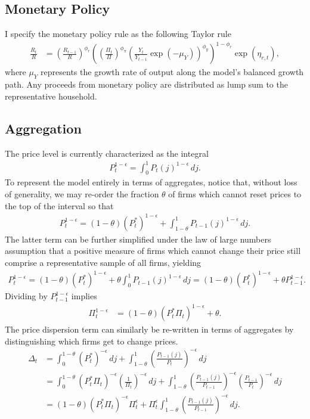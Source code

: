 \documentclass[12 pt, oneside]{article}
\theoremstyle{definition}
\theoremstyle{definition}
\theoremstyle{definition}
\begin{document}
\subsection{Monetary Policy}
I specify the monetary policy rule as the following Taylor rule
\begin{align}\label{eq:taylor rule}
  \frac{R_t}{R} & =  \left(\frac{R_{t - 1}}{R}\right)^{\phi_r}\left(\left(\frac{\Pi_t}{\Pi}\right)^{\phi_\pi}\left(\frac{Y_t}{Y_{t - 1}}\exp(-\mu_Y)\right)^{\phi_y}\right)^{1 - \phi_r}\exp(\eta_{r, t}),
\end{align}
where $\mu_Y$ represents the growth rate of output along the model's balanced growth path.
Any proceeds from monetary policy are distributed as lump sum to the representative household.

\subsection{Aggregation}
The price level is currently characterized as the integral
\begin{align*}
  P_t^{1 - \epsilon} = \int_0^1 P_t(j)^{1 - \epsilon}\, dj.
\end{align*}
To represent the model entirely in terms of aggregates, notice that, without loss of generality, we may re-order the fraction $\theta$ of firms which cannot reset prices to the top of the interval so that
\begin{align*}
  P_t^{1 - \epsilon} = (1 - \theta)(P_t^*)^{1 - \epsilon} +  \int_{1 - \theta}^1 P_{t - 1}(j)^{1 - \epsilon}\, dj.
\end{align*}
The latter term can be further simplified under the law of large numbers assumption that a positive measure of firms which cannot change their price
still comprise a representative sample of all firms, yielding
\begin{align*}
  P_t^{1 - \epsilon} = (1 - \theta)(P_t^*)^{1 - \epsilon} +  \theta\int_0^1 P_{t - 1}(j)^{1 - \epsilon}\, dj = (1 - \theta)(P_t^*)^{1 - \epsilon} +  \theta P_{t - 1}^{1 - \epsilon}.
\end{align*}
Dividing by $P_{t - 1}^{1 - \epsilon}$ implies
\begin{align}\label{eq:inflation from optimal reset price}
  \Pi_t^{ 1 - \epsilon} & = (1 - \theta) (P_t^*\Pi_t)^{1 - \epsilon} + \theta.
\end{align}
The price dispersion term can similarly be re-written in terms of aggregates by distinguishing which firms get to change prices.
\begin{align*}
  \Delta_t & = \int_0^{1 - \theta}\left(P_t^*\right)^{ - \epsilon}\, dj + \int_{1 - \theta}^1 \left(\frac{P_{t - 1}(j)}{P_t}\right)^{ - \epsilon}\, dj\\
      & = \int_0^{1 - \theta}\left(P_t^*\Pi_t\right)^{ - \epsilon}\left(\frac{1}{\Pi_t}\right)^{ - \epsilon}\, dj + \int_{1 - \theta}^1 \left(\frac{P_{t - 1}(j)}{P_{t - 1}}\right)^{ - \epsilon}\left(\frac{P_{t - 1}}{P_t}\right)^{ - \epsilon}\, dj\\
      & = (1 - \theta) (P_t^*\Pi_t)^{-\epsilon} \Pi_t^{\epsilon}  + \Pi_t^{\epsilon} \int_{1 - \theta}^1 \left(\frac{P_{t - 1}(j)}{P_{t - 1}}\right)^{ - \epsilon}\,dj.
\end{align*}
\end{document}
